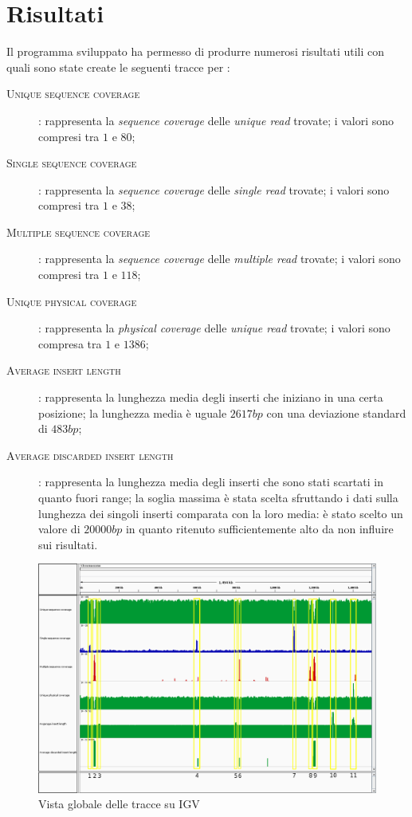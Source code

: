 \section{Risultati}
\label{sec:risultati}
Il programma sviluppato ha permesso di produrre numerosi risultati utili con quali sono state create le seguenti tracce per :
\begin{description}
\item[\textsc{Unique sequence coverage}]: rappresenta la \emph{sequence coverage} delle \emph{unique read} trovate; i valori sono compresi tra $1$ e $80$;
\item[\textsc{Single sequence coverage}]: rappresenta la \emph{sequence coverage} delle \emph{single read} trovate; i valori sono compresi tra $1$ e $38$;
\item[\textsc{Multiple sequence coverage}]: rappresenta la \emph{sequence coverage} delle \emph{multiple read} trovate; i valori sono compresi tra $1$ e $118$;
\item[\textsc{Unique physical coverage}]: rappresenta la \emph{physical coverage} delle \emph{unique read} trovate; i valori sono compresa tra $1$ e $1386$;
\item[\textsc{Average insert length}]: rappresenta la lunghezza media degli inserti che iniziano in una certa posizione; la lunghezza media è uguale $2617 bp$ con una deviazione standard di $483 bp$;
\item[\textsc{Average discarded insert length}]: rappresenta la lunghezza media degli inserti che sono stati scartati in quanto fuori range; la soglia massima è stata scelta sfruttando i dati sulla lunghezza dei singoli inserti comparata con la loro media: è stato scelto un valore di $20000 bp$ in quanto ritenuto sufficientemente alto da non influire sui risultati.
\end{description}

\begin{figure}[htbp]
\centering
\includegraphics[width=\textwidth]{immagini/igv_global.png}
\caption{Vista globale delle tracce su IGV}
\label{fig:igv globale}
\end{figure}

